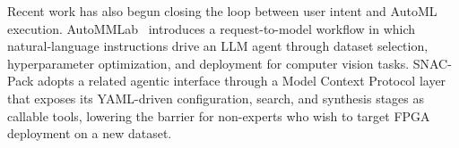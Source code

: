 \documentclass[11pt]{article}
\begin{document}
Recent work has also begun closing the loop between user intent and AutoML execution.
AutoMMLab~\citep{yang2025autommlab} introduces a request-to-model workflow in which natural-language instructions drive an LLM agent through dataset selection, hyperparameter optimization, and deployment for computer vision tasks.
SNAC-Pack adopts a related agentic interface through a Model Context Protocol layer that exposes its YAML-driven configuration, search, and synthesis stages as callable tools, lowering the barrier for non-experts who wish to target FPGA deployment on a new dataset.
 











\end{document}
